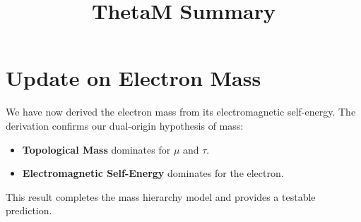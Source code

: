 \documentclass{article}
\title{ThetaM Summary}
\begin{document}
\maketitle

\section*{Update on Electron Mass}
We have now derived the electron mass from its electromagnetic self-energy. The derivation confirms our dual-origin hypothesis of mass:

\begin{itemize}
    \item \textbf{Topological Mass} dominates for $\mu$ and $\tau$.
    \item \textbf{Electromagnetic Self-Energy} dominates for the electron.
\end{itemize}

This result completes the mass hierarchy model and provides a testable prediction.
\end{document}
